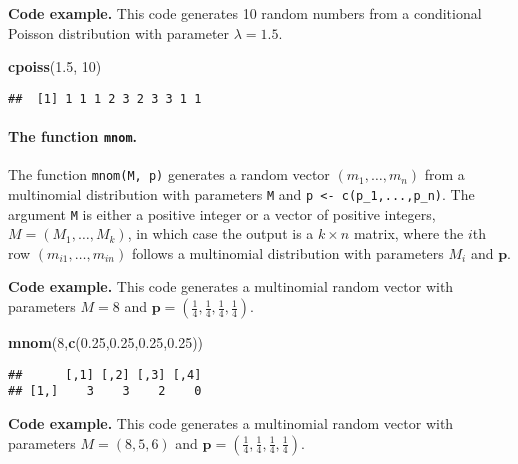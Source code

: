 \documentclass[
]{article}
\newenvironment{Shaded}{\begin{snugshade}}{\end{snugshade}}
\newcommand{\DecValTok}[1]{\textcolor[rgb]{0.00,0.00,0.81}{#1}}
\newcommand{\FloatTok}[1]{\textcolor[rgb]{0.00,0.00,0.81}{#1}}
\newcommand{\FunctionTok}[1]{\textcolor[rgb]{0.13,0.29,0.53}{\textbf{#1}}}
\newcommand{\NormalTok}[1]{#1}
\begin{document}
\textbf{Code example.} This code generates 10 random numbers from a
conditional Poisson distribution with parameter \(\lambda=1.5\).

\begin{Shaded}
\begin{Highlighting}[]
\FunctionTok{cpoiss}\NormalTok{(}\FloatTok{1.5}\NormalTok{, }\DecValTok{10}\NormalTok{)}
\end{Highlighting}
\end{Shaded}

\begin{verbatim}
##  [1] 1 1 1 2 3 2 3 3 1 1
\end{verbatim}

\hypertarget{the-function-mnom.}{%
\paragraph{\texorpdfstring{The function
\texttt{mnom}.}{The function mnom.}}\label{the-function-mnom.}}

The function \texttt{mnom(M,\ p)} generates a random vector
\((m_1, \ldots, m_n)\) from a multinomial distribution with parameters
\texttt{M} and \texttt{p\ \textless{}-\ c(p\_1,...,p\_n)}. The argument
\texttt{M} is either a positive integer or a vector of positive
integers, \(M=(M_1,\ldots,M_k)\), in which case the output is a
\(k\times n\) matrix, where the \(i\)th row \((m_{i1},\ldots,m_{in})\)
follows a multinomial distribution with parameters \(M_i\) and
\(\pmb p\).

\textbf{Code example.} This code generates a multinomial random vector
with parameters \(M=8\) and
\(\pmb p=(\frac 14,\frac 14,\frac 14,\frac 14)\).

\begin{Shaded}
\begin{Highlighting}[]
\FunctionTok{mnom}\NormalTok{(}\DecValTok{8}\NormalTok{,}\FunctionTok{c}\NormalTok{(}\FloatTok{0.25}\NormalTok{,}\FloatTok{0.25}\NormalTok{,}\FloatTok{0.25}\NormalTok{,}\FloatTok{0.25}\NormalTok{))}
\end{Highlighting}
\end{Shaded}

\begin{verbatim}
##      [,1] [,2] [,3] [,4]
## [1,]    3    3    2    0
\end{verbatim}

\textbf{Code example.} This code generates a multinomial random vector
with parameters \(M=(8,5,6)\) and
\(\pmb p=(\frac 14,\frac 14,\frac 14,\frac 14)\).
\end{document}
